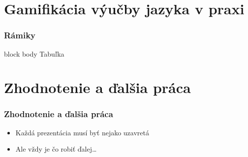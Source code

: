 \documentclass{beamer}
\newenvironment{poznamka}{\begin{beamercolorbox}[rounded=true,shadow=false]{block body}}{\end{beamercolorbox}}
\begin{document}
\section{Gamifikácia výučby jazyka v praxi}

\begin{frame}[fragile=singleslide,plain]\frametitle{Rámiky}
\begin{poznamka}
Tabuľka
\end{poznamka}

\end{frame}



\section*{Zhodnotenie a ďalšia práca}

\begin{frame}[fragile=singleslide]\frametitle{Zhodnotenie a ďalšia práca}
\begin{itemize}
\item Každá prezentácia musí byť nejako uzavretá
\item Ale vždy je čo robiť ďalej\ldots{}
\end{itemize}
\end{frame}
\end{document}
